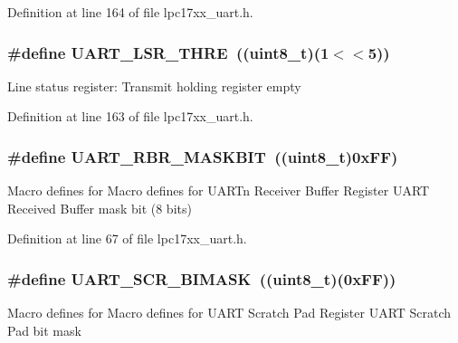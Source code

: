 \-Definition at line 164 of file lpc17xx\-\_\-uart.\-h.

\hypertarget{group___u_a_r_t___private___macros_gae05118527ef8873b9d7b1b0be0153019}{
\subsubsection[{\-U\-A\-R\-T\-\_\-\-L\-S\-R\-\_\-\-T\-H\-R\-E}]{\setlength{\rightskip}{0pt plus 5cm}\#define {\bf \-U\-A\-R\-T\-\_\-\-L\-S\-R\-\_\-\-T\-H\-R\-E}~((uint8\-\_\-t)(1$<$$<$5))}}\label{group___u_a_r_t___private___macros_gae05118527ef8873b9d7b1b0be0153019}
\-Line status register\-: \-Transmit holding register empty 

\-Definition at line 163 of file lpc17xx\-\_\-uart.\-h.

\hypertarget{group___u_a_r_t___private___macros_ga06774e65c2ca095c4373122ed9a390b8}{
\subsubsection[{\-U\-A\-R\-T\-\_\-\-R\-B\-R\-\_\-\-M\-A\-S\-K\-B\-I\-T}]{\setlength{\rightskip}{0pt plus 5cm}\#define {\bf \-U\-A\-R\-T\-\_\-\-R\-B\-R\-\_\-\-M\-A\-S\-K\-B\-I\-T}~((uint8\-\_\-t)0x\-F\-F)}}\label{group___u_a_r_t___private___macros_ga06774e65c2ca095c4373122ed9a390b8}
\-Macro defines for \-Macro defines for \-U\-A\-R\-Tn \-Receiver \-Buffer \-Register \-U\-A\-R\-T \-Received \-Buffer mask bit (8 bits) 

\-Definition at line 67 of file lpc17xx\-\_\-uart.\-h.

\hypertarget{group___u_a_r_t___private___macros_ga055f27dcd4a5664ffec09bf024e19120}{
\subsubsection[{\-U\-A\-R\-T\-\_\-\-S\-C\-R\-\_\-\-B\-I\-M\-A\-S\-K}]{\setlength{\rightskip}{0pt plus 5cm}\#define {\bf \-U\-A\-R\-T\-\_\-\-S\-C\-R\-\_\-\-B\-I\-M\-A\-S\-K}~((uint8\-\_\-t)(0x\-F\-F))}}\label{group___u_a_r_t___private___macros_ga055f27dcd4a5664ffec09bf024e19120}
\-Macro defines for \-Macro defines for \-U\-A\-R\-T \-Scratch \-Pad \-Register \-U\-A\-R\-T \-Scratch \-Pad bit mask 

